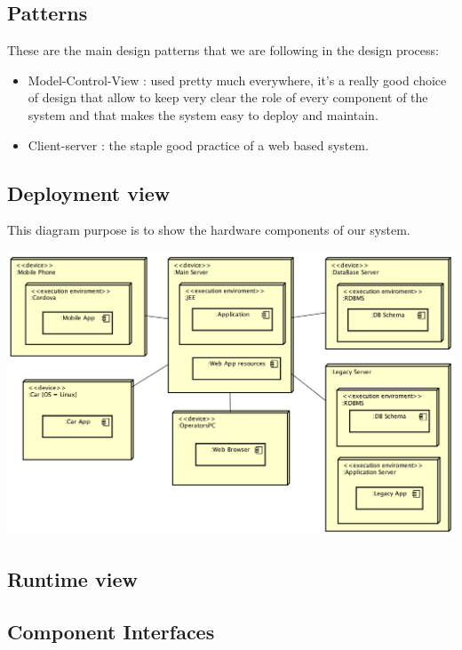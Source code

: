 \documentclass[]{article}
\providecommand{\tightlist}{%
  \setlength{\itemsep}{0pt}\setlength{\parskip}{0pt}}
\begin{document}
\subsection{Patterns}\label{patterns}

These are the main design patterns that we are following in the design
process:

\begin{itemize}
\tightlist
\item
  Model-Control-View : used pretty much everywhere, it's a really good
  choice of design that allow to keep very clear the role of every
  component of the system and that makes the system easy to deploy and
  maintain.
\item
  Client-server : the staple good practice of a web based system.
\end{itemize}

\subsection{Deployment view}\label{deployment-view}

This diagram purpose is to show the hardware components of our system.
\centerline{\includegraphics{./deployment/diagram.png}}

\subsection{Runtime view}\label{runtime-view}

\subsection{Component Interfaces}\label{component-interfaces}
\end{document}
